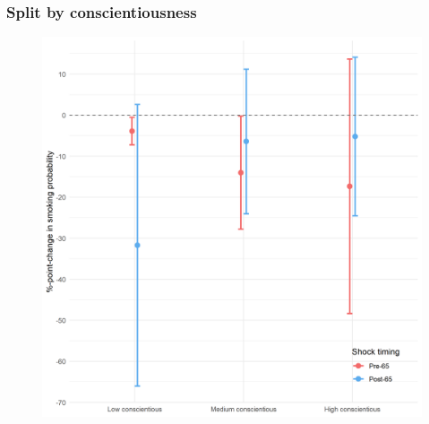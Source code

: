 \documentclass[10pt,compress,xcolor=dvipsnames,aspectratio=169]{beamer}    %
\newcounter{ex}
\newcommand{\1}[1]{\mathrm{1\hspace*{-2.5pt}l}[#1]}	%
\begin{document}
\begin{frame}
\frametitle{Split by conscientiousness}

\begin{figure}[hbtp]
\centering
\includegraphics[height=0.8\textheight]{../../3_output/shock_effects/consc_6070_100_cvplot.png}
\label{fig:consc}
\end{figure}
\hyperlink{frame:otherX}{}
\end{frame}
\end{document}
